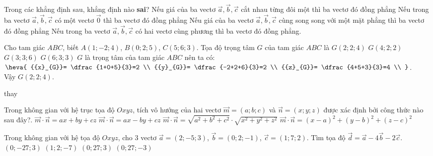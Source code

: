 \begin{ex}%
	Trong các khẳng định sau, khẳng định nào \textbf{sai}?
	\choice
	{\True Nếu giá của ba vectơ $\overrightarrow{a},\overrightarrow{b},\overrightarrow{c}$ cắt nhau từng đôi một thì ba vectơ đó đồng phẳng}
	{Nếu trong ba vectơ $\overrightarrow{a},\overrightarrow{b},\overrightarrow{c}$ có một vectơ $\overrightarrow{0}$ thì ba vectơ đó đồng phẳng}
	{Nếu giá của ba vectơ $\overrightarrow{a},\overrightarrow{b},\overrightarrow{c}$ cùng song song với một mặt phẳng thì ba vectơ đó đồng phẳng}
	{Nếu trong ba vectơ $\overrightarrow{a},\overrightarrow{b},\overrightarrow{c}$ có hai vectơ cùng phương thì ba vectơ đó đồng phẳng.
	}
	 \end{ex}

\begin{ex}%
	Cho tam giác $ABC$, biết $A (1;-2;4 )$, $B (0;2;5 )$, $C (5;6;3 )$. Tọa độ trọng tâm $G$ của tam giác $ABC$ là
	\choice
	{\True $G (2;2;4 )$}
	{$G (4;2;2 )$}
	{$G (3;3;6 )$}
	{$G (6;3;3 )$}
	\loigiai
	{
	$G$ là trọng tâm của tam giác $ABC$ nên ta có:
	$\heva{
		{{x}_{G}}= \dfrac{1+0+5}{3}=2  \\
		{{y}_{G}}= \dfrac{-2+2+6}{3}=2  \\
		{{z}_{G}}= \dfrac{4+5+3}{3}=4  \\
		}$.\\
	Vậy $G (2;2;4 )$.
	}
\end{ex}

\begin{ex}%
	thay
\end{ex}

\begin{ex}%
	Trong không gian với hệ trục tọa độ $Oxyz$, tích vô hướng của hai vectơ $\overrightarrow{m}=(a;b;c)$ và $\overrightarrow{n}=(x;y;z)$ được xác định bởi công thức nào sau đây?.
	\choice
	{\True $\overrightarrow{m}\cdot \overrightarrow{n}=ax+by+cz$}
	{$\overrightarrow{m}\cdot \overrightarrow{n}=ax-by+cz$}
	{$\overrightarrow{m}\cdot \overrightarrow{n}=\sqrt{a^2+b^2+c^2}\cdot \sqrt{x^2+y^2+z^2}$}
	{$\overrightarrow{m}\cdot \overrightarrow{n}={{(x-a)}^2}+{{(y-b)}^2}+{{(z-c)}^2}$}
\end{ex}

\begin{ex}%
	Trong không gian với hệ tọa độ $Oxyz$, cho $3$ vectơ $\vec{a}=\left(2;-5;3\right)$, $\vec{b}=\left(0;2;-1\right)$, $\vec{c}=\left(1;7;2\right)$. Tìm tọa độ $\vec{d}=\vec{a}-4\vec{b}-2\vec{c}$.
	\choice
	{\True $\left(0;-27;3\right)$}
	{$\left(1;2;-7\right)$}
	{$\left(0;27;3\right)$}
	{$\left(0;27;-3\right)$}
\end{ex}

